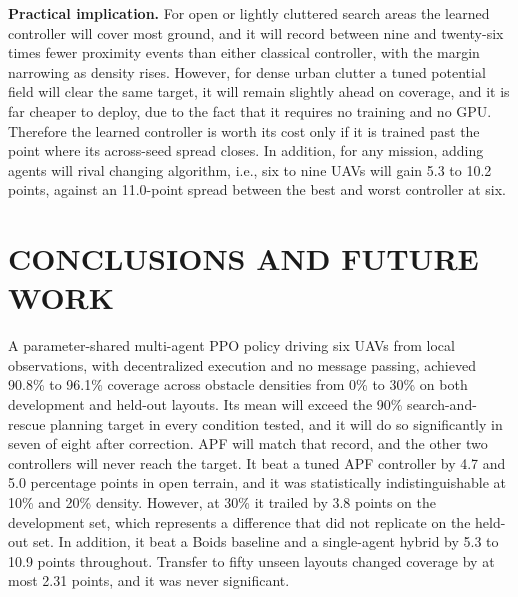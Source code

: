 \documentclass[a4paper, 10pt, conference]{ieeeconf}
\begin{document}
\textbf{Practical implication.} For open or lightly cluttered search
areas the learned controller will cover most ground, and it will
record between nine and twenty-six times fewer proximity events than
either classical controller, with the margin narrowing as density
rises. However, for dense urban clutter a tuned potential field will
clear the same target, it will remain slightly ahead on coverage, and
it is far cheaper to deploy, due to the fact that it requires no
training and no GPU. Therefore the learned controller is worth its
cost only if it is trained past the point where its across-seed spread
closes. In addition, for any mission, adding agents will rival
changing algorithm, i.e., six to nine UAVs will gain 5.3 to 10.2
points, against an 11.0-point spread between the best and worst
controller at six.

\section{CONCLUSIONS AND FUTURE WORK}\label{sec:conclusion}

A parameter-shared multi-agent PPO policy driving six UAVs from local
observations, with decentralized execution and no message passing,
achieved 90.8\% to 96.1\% coverage across obstacle densities from 0\%
to 30\% on both development and held-out layouts. Its mean will exceed
the 90\% search-and-rescue planning target in every condition tested,
and it will do so significantly in seven of eight after correction.
APF will match that record, and the other two controllers will never
reach the target. It beat a tuned APF controller by 4.7 and 5.0
percentage points in open terrain, and it was statistically
indistinguishable at 10\% and 20\% density. However, at 30\% it
trailed by 3.8 points on the development set, which represents a
difference that did not replicate on the held-out set. In addition, it
beat a Boids baseline and a single-agent hybrid by 5.3 to 10.9 points
throughout. Transfer to fifty unseen layouts changed coverage by at
most 2.31 points, and it was never significant.
\end{document}
